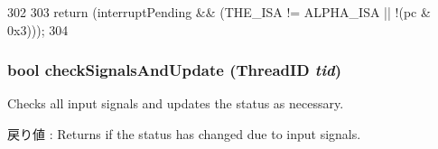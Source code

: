 \begin{DoxyCode}
302     {
303         return (interruptPending && (THE_ISA != ALPHA_ISA || !(pc & 0x3)));
304     }
\end{DoxyCode}
\hypertarget{classDefaultFetch_af77f2bf38a75182c65e633b9fdf295d2}{
\subsubsection[{checkSignalsAndUpdate}]{\setlength{\rightskip}{0pt plus 5cm}bool checkSignalsAndUpdate ({\bf ThreadID} {\em tid})}}
\label{classDefaultFetch_af77f2bf38a75182c65e633b9fdf295d2}
Checks all input signals and updates the status as necessary. \begin{DoxyReturn}{戻り値}
: Returns if the status has changed due to input signals. 
\end{DoxyReturn}



